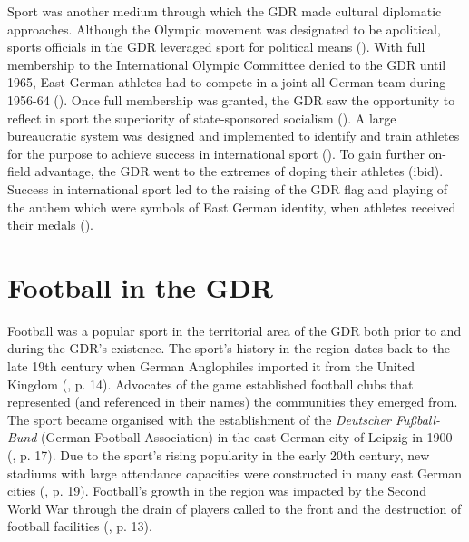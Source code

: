 Sport was another medium through which the GDR made cultural diplomatic approaches. Although the Olympic movement was designated to be apolitical, sports officials in the GDR leveraged sport for political means (\cite{balbier2009}). With full membership to the International Olympic Committee denied to the GDR until 1965, East German athletes had to compete in a joint all-German team during 1956-64 (\cite{balbier2009}). Once full membership was granted, the GDR saw the opportunity to reflect in sport the superiority of state-sponsored socialism (\cite{frenkin1964}). A large bureaucratic system was designed and implemented to identify and train athletes for the purpose to achieve success in international sport (\cite{dennisgrix2012}). To gain further on-field advantage, the GDR went to the extremes of doping their athletes (ibid). Success in international sport led to the raising of the GDR flag and playing of the anthem which were symbols of East German identity, when athletes received their medals (\cite{balbier2009}).

\section*{Football in the GDR}

Football was a popular sport in the territorial area of the GDR both prior to and during the GDR’s existence. The sport’s history in the region dates back to the late 19th century when German Anglophiles imported it from the United Kingdom (\cite{mcdougall2014}, p. 14). Advocates of the game established football clubs that represented (and referenced in their names) the communities they emerged from. The sport became organised with the establishment of the \textit{Deutscher Fußball-Bund} (German Football Association) in the east German city of Leipzig in 1900 (\cite{peifferschulze-marmeling2008}, p. 17). Due to the sport’s rising popularity in the early 20th century, new stadiums with large attendance capacities were constructed in many east German cities (\cite{mcdougall2014}, p. 19). Football’s growth in the region was impacted by the Second World War through the drain of players called to the front and the destruction of football facilities (\cite{fuge2009}, p. 13).

